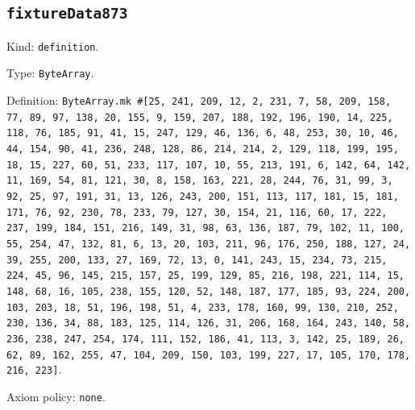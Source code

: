 \documentclass[11pt]{article}
\begin{document}
\subsection*{\texttt{fixtureData873}}
\noindent Kind: \texttt{definition}.\par
\noindent Type: \texttt{ByteArray}.\par
\noindent Definition: \texttt{ByteArray.mk \#[25, 241, 209, 12, 2, 231, 7, 58, 209, 158, 77, 89, 97, 138, 20, 155, 9, 159, 207, 188, 192, 196, 190, 14, 225, 118, 76, 185, 91, 41, 15, 247, 129, 46, 136, 6, 48, 253, 30, 10, 46, 44, 154, 90, 41, 236, 248, 128, 86, 214, 214, 2, 129, 118, 199, 195, 18, 15, 227, 60, 51, 233, 117, 107, 10, 55, 213, 191, 6, 142, 64, 142, 11, 169, 54, 81, 121, 30, 8, 158, 163, 221, 28, 244, 76, 31, 99, 3, 92, 25, 97, 191, 31, 13, 126, 243, 200, 151, 113, 117, 181, 15, 181, 171, 76, 92, 230, 78, 233, 79, 127, 30, 154, 21, 116, 60, 17, 222, 237, 199, 184, 151, 216, 149, 31, 98, 63, 136, 187, 79, 102, 11, 100, 55, 254, 47, 132, 81, 6, 13, 20, 103, 211, 96, 176, 250, 188, 127, 24, 39, 255, 200, 133, 27, 169, 72, 13, 0, 141, 243, 15, 234, 73, 215, 224, 45, 96, 145, 215, 157, 25, 199, 129, 85, 216, 198, 221, 114, 15, 148, 68, 16, 105, 238, 155, 120, 52, 148, 187, 177, 185, 93, 224, 200, 103, 203, 18, 51, 196, 198, 51, 4, 233, 178, 160, 99, 130, 210, 252, 230, 136, 34, 88, 183, 125, 114, 126, 31, 206, 168, 164, 243, 140, 58, 236, 238, 247, 254, 174, 111, 152, 186, 41, 113, 3, 142, 25, 189, 26, 62, 89, 162, 255, 47, 104, 209, 150, 103, 199, 227, 17, 105, 170, 178, 216, 223]}.\par
\noindent Axiom policy: \texttt{none}.\par
\end{document}
